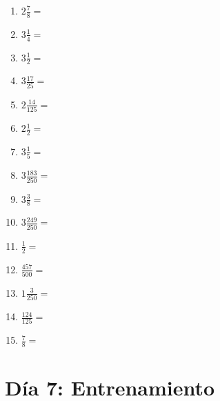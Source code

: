 \documentclass[12pt]{article}
\begin{document}
\begin{enumerate}
\item \large $ 2 \frac{7}{8} = $ \vspace{1.5cm}
\item \large $ 3 \frac{1}{4} = $ \vspace{1.5cm}
\item \large $ 3 \frac{1}{2} = $ \vspace{1.5cm}
\item \large $ 3 \frac{17}{25} = $ \vspace{1.5cm}
\item \large $ 2 \frac{14}{125} = $ \vspace{1.5cm}
\newpage
\item \large $ 2 \frac{1}{2} = $ \vspace{1.5cm}
\item \large $ 3 \frac{1}{5} = $ \vspace{1.5cm}
\item \large $ 3 \frac{183}{250} = $ \vspace{1.5cm}
\item \large $ 3 \frac{3}{8} = $ \vspace{1.5cm}
\item \large $ 3 \frac{249}{250} = $ \vspace{1.5cm}
\item \large $ \frac{1}{2} = $ \vspace{1.5cm}
\item \large $ \frac{457}{500} = $ \vspace{1.5cm}
\item \large $ 1 \frac{3}{250} = $ \vspace{1.5cm}
\item \large $ \frac{124}{125} = $ \vspace{1.5cm}
\item \large $ \frac{7}{8} = $ \vspace{1.5cm}
\end{enumerate}\newpage
\section*{Día 7: Entrenamiento}
\end{document}
